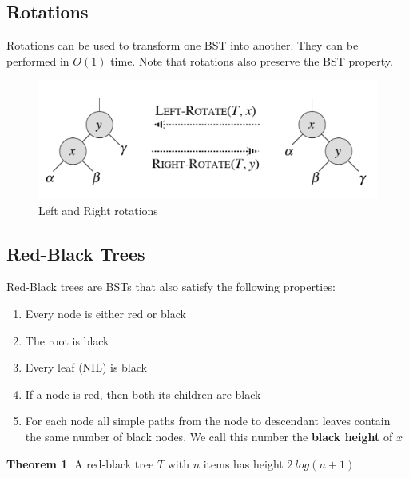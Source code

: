 \documentclass{article}
\theoremstyle{plain}
\theoremstyle{definition}
\newtheorem{thm}{Theorem}
\begin{document}
    \subsection{Rotations}

    Rotations can be used to transform one BST into another. They can be performed in $O(1)$ time. Note that rotations also preserve the BST property. 

    \begin{figure}[H]
        \centering
        \includegraphics[width=\linewidth]{images/rotate.png}
        \caption{Left and Right rotations}
        \label{fig:rotate}
    \end{figure}
    
    \subsection{Red-Black Trees}

        Red-Black trees are BSTs that also satisfy the following properties:

        \begin{enumerate}
            \item Every node is either red or black
            \item The root is black
            \item Every leaf (NIL) is black
            \item If a node is red, then both its children are black
            \item For each node all simple paths from the node to descendant leaves contain the same number of black nodes. We call this number the \textbf{black height} of $x$
        \end{enumerate}

        \begin{thm}
            A red-black tree $T$ with $n$ items has height $ 2 \ log(n+1)$
        \end{thm}
\end{document}
